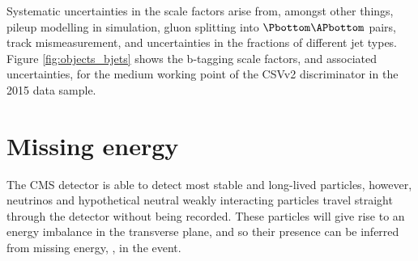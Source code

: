 Systematic uncertainties in the scale factors arise from, amongst other things,
pileup modelling in simulation, gluon splitting into $\Pbottom\APbottom$ pairs, track mismeasurement,
and uncertainties in the fractions of different jet types.
Figure \ref{fig:objects_bjets} shows the b-tagging scale factors, and associated uncertainties,
for the medium working point of the \ac{CSV}v2 discriminator in the
2015 data sample.

\section{Missing energy}
\label{sec:objects_met}
The \ac{CMS} detector is able to detect most stable and long-lived particles,
however, neutrinos and hypothetical neutral weakly interacting particles
travel straight through the detector without being recorded. These particles
will give rise to an energy imbalance in the transverse plane, and so their
presence can be inferred from missing energy, \MET, in the event. 

